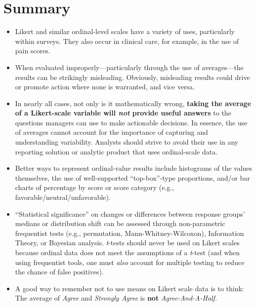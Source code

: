 \documentclass[]{book}
\newenvironment{Shaded}{\begin{snugshade}}{\end{snugshade}}
\newcommand{\KeywordTok}[1]{\textcolor[rgb]{0.13,0.29,0.53}{\textbf{{#1}}}}
\newcommand{\DataTypeTok}[1]{\textcolor[rgb]{0.13,0.29,0.53}{{#1}}}
\newcommand{\StringTok}[1]{\textcolor[rgb]{0.31,0.60,0.02}{{#1}}}
\newcommand{\CommentTok}[1]{\textcolor[rgb]{0.56,0.35,0.01}{\textit{{#1}}}}
\newcommand{\NormalTok}[1]{{#1}}
\begin{document}
\begin{Shaded}
\begin{Highlighting}[]
{{{{\CommentTok{# Make a data frame for prop odds}
\NormalTok{Teamwork_tab_long$Teamwork_Group =}\StringTok{ }\KeywordTok{as.numeric}\NormalTok{(Teamwork_tab_long$Teamwork) }
\NormalTok{Teamwork_tab_long$Teamwork =}\StringTok{ }\KeywordTok{ordered}\NormalTok{(Teamwork_tab_long$Teamwork) }
\NormalTok{tab_df =}\StringTok{ }\KeywordTok{data.frame}\NormalTok{(}\KeywordTok{countsToCases}\NormalTok{(Teamwork_tab_long, }\DataTypeTok{countcol=}\StringTok{"Count"}\NormalTok{))}
\end{Highlighting}
\end{Shaded}

\chapter{Summary}\label{summary}

\begin{itemize}
\item
  Likert and similar ordinal-level scales have a variety of uses,
  particularly within surveys. They also occur in clinical care, for
  example, in the use of pain scores.
\item
  When evaluated improperly---particularly through the use of
  averages---the results can be strikingly misleading. Obviously,
  misleading results could drive or promote action where none is
  warranted, and vice versa.
\item
  In nearly all cases, not only is it mathematically wrong,
  \textbf{taking the average of a Likert-scale variable will \emph{not}
  provide useful answers} to the questions managers can use to make
  actionable decisions. In essence, the use of averages cannot account
  for the importance of capturing and understanding variability.
  Analysts should strive to avoid their use in any reporting solution or
  analytic product that uses ordinal-scale data.
\item
  Better ways to represent ordinal-value results include histograms of
  the values themselves, the use of well-supported ``top-box''-type
  proportions, and/or bar charts of percentage by score or score
  category (e.g., favorable/neutral/unfavorable).
\item
  ``Statistical significance'' on changes or differences between
  response groups' medians or distribution shift can be assessed through
  non-parametric frequentist tests (e.g., permutation,
  Mann-Whitney-Wilcoxon), Information Theory, or Bayesian analysis.
  \emph{t}-tests should never be used on Likert scales because ordinal
  data does not meet the assumptions of a \emph{t}-test (and when using
  frequentist tools, one must \emph{also} account for multiple testing
  to reduce the chance of false positives).
\item
  A good way to remember not to use means on Likert scale data is to
  think: The average of \emph{Agree} and \emph{Strongly Agree} is
  \textbf{not} \emph{Agree-And-A-Half}.
\end{itemize}
\end{document}
